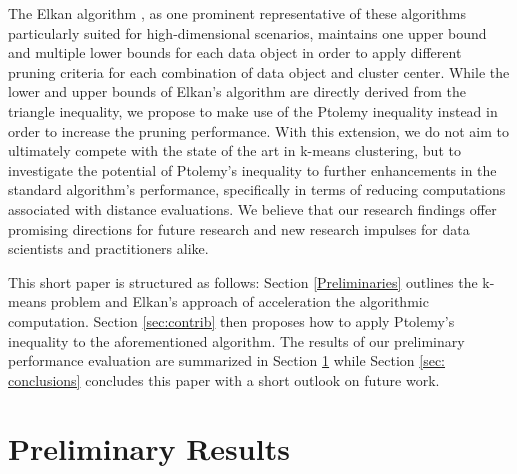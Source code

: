 The Elkan algorithm \cite{DBLP:conf/icml/Elkan03}, as one prominent representative of these algorithms particularly suited for high-dimensional scenarios, maintains one upper bound and multiple lower bounds for each data object in order to apply different pruning criteria for each combination of data object and cluster center. While the lower and upper bounds of Elkan's algorithm are directly derived from the triangle inequality, we propose to make use of the Ptolemy inequality instead in order to increase the pruning performance. With this extension, we do not aim to ultimately compete with the state of the art in k-means clustering, but to investigate the potential of Ptolemy’s inequality to further enhancements in the standard algorithm’s performance, specifically in terms of reducing computations associated with distance evaluations. We believe that our research findings offer promising directions for future research and new research impulses for data scientists and practitioners alike.

This short paper is structured as follows: Section \ref{Preliminaries} outlines the k-means problem and Elkan's approach of acceleration the algorithmic computation. Section \ref{sec:contrib} then proposes how to apply Ptolemy's inequality to the aforementioned algorithm. The results of our preliminary performance evaluation are summarized in Section \ref{sec: results} while Section \ref{sec: conclusions} concludes this paper with a short outlook on future work.













\section{Preliminary Results}\label{sec: results}







